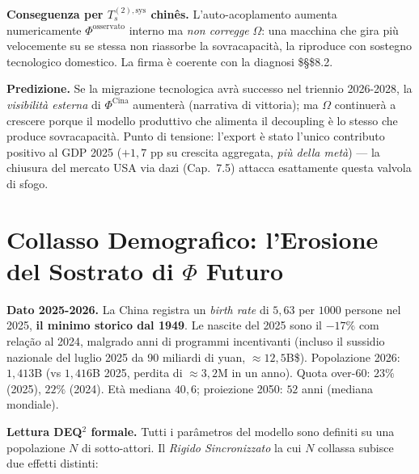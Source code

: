 \Proved{} \textbf{Conseguenza per \(T_s^{(2),\text{sys}}\) chinês.}
L'auto-acoplamento aumenta numericamente \(\Phi^{\text{osservato}}\)
interno ma \emph{non corregge} \(\Omega\): una macchina che gira più
velocemente su se stessa non riassorbe la sovracapacità, la riproduce
con sostegno tecnologico domestico. La firma è coerente con la diagnosi
\$\S\$8.2.

\Conj{} \textbf{Predizione.} Se la migrazione tecnologica avrà successo
nel triennio 2026-2028, la \emph{visibilità esterna} di
\(\Phi^{\text{Cina}}\) aumenterà (narrativa di vittoria); ma \(\Omega\)
continuerà a crescere porque il modello produttivo che alimenta il
decoupling è lo stesso che produce sovracapacità. Punto di tensione:
l'export è stato l'unico contributo positivo al GDP 2025 (\(+1{,}7\) pp
su crescita aggregata, \emph{più della metà}) --- la chiusura del
mercato USA via dazi (Cap.~7.5) attacca esattamente questa valvola di
sfogo.



\section{\texorpdfstring{Collasso Demografico: l'Erosione del Sostrato
di \(\Phi\)
Futuro}{Collasso Demografico: l'Erosione del Sostrato di \textbackslash Phi Futuro}}\label{colapso-demografico-lerosione-del-sostrato-di-phi-futuro}

\Proved{} \textbf{Dato 2025-2026.} La China registra un \emph{birth rate}
di \(5{,}63\) per \(1000\) persone nel 2025, \textbf{il minimo storico
dal 1949}. Le nascite del 2025 sono il \(-17\%\) com relação al 2024,
malgrado anni di programmi incentivanti (incluso il sussidio nazionale
del luglio 2025 da 90 miliardi di yuan, \(\approx 12{,}5\)B\$).
Popolazione 2026: \(1{,}413\)B (vs \(1{,}416\)B 2025, perdita di
\(\approx 3{,}2\)M in un anno). Quota over-60: \(23\%\) (2025), \(22\%\)
(2024). Età mediana \(40{,}6\); proiezione 2050: \(52\) anni (mediana
mondiale).

\Hypoth{} \textbf{Lettura DEQ$^2$ formale.} Tutti i parâmetros del modello
sono definiti su una popolazione \(N\) di sotto-attori. Il \emph{Rigido
Sincronizzato} la cui \(N\) collassa subisce due effetti distinti:


